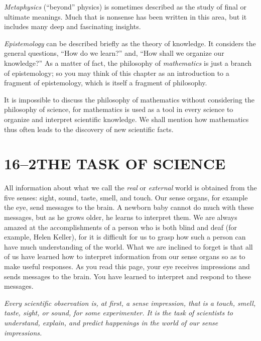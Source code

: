 \documentclass[11pt]{book}
\theoremstyle{bkplain}
\theoremstyle{XIplainnote}
\theoremstyle{bkplain}
\theoremstyle{bkplain}
\begin{document}
\emph{Metaphysics} (``beyond'' physics) is sometimes described as the study of
final or ultimate meanings. Much that is nonsense has been written in this
area, but it includes many deep and fascinating insights.

\emph{Epistemology} can be described briefly as the theory of knowledge. It
considers the general questions, ``How do we learn?'' and, ``How shall we
organize our knowledge?'' As a matter of fact, the philosophy of
\emph{mathematics} is just a branch of epistemology; so you may think of this
chapter as an introduction to a fragment of epistemology, which is itself a
fragment of philosophy.

It is impossible to discuss the philosophy of mathematics without considering
the philosophy of science, for mathematics is used as a tool in every science
to organize and interpret scientific knowledge. We shall mention how
mathematics thus often leads to the discovery of new scientific facts.

\section*{16--2\quad THE TASK OF SCIENCE}

All information about what we call the \emph{real} or \emph{external} world is
obtained from the five senses: sight, sound, taste, smell, and touch. Our
sense organs, for example the eye, send messages to the brain. A newborn baby
cannot do much with these messages, but as he grows older, he learns to
interpret them. We are always amazed at the accomplishments of a person who is
both blind and deaf (for example, Helen Keller), for it is difficult for us to
grasp how such a person can have much understanding of the world. What we are
inclined to forget is that all of us have learned how to interpret information
from our sense organs so as to make useful responses. As you read this page,
your eye receives impressions and sends messages to the brain. You have
learned to interpret and respond to these messages.

\emph{Every scientific observation is, at first, a sense impression, that is a
touch, smell, taste, sight, or sound, for some experimenter. It is the task of
scientists to understand, explain, and predict happenings in the world of our
sense impressions.}
\end{document}
